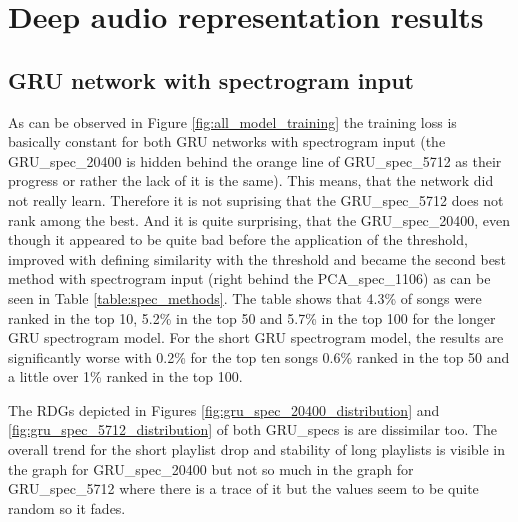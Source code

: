 \section{Deep audio representation results}\label{sec:deep_audio_results}

\subsection{GRU network with spectrogram input}\label{ssec:gru_spec_results}

As can be observed in Figure \ref{fig:all_model_training} the training loss is basically constant for both GRU networks with spectrogram input (the GRU\_spec\_20400 is hidden behind the orange line of GRU\_spec\_5712 as their progress or rather the lack of it is the same). This means, that the network did not really learn. Therefore it is not suprising that the GRU\_spec\_5712 does not rank among the best. And it is quite surprising, that the GRU\_spec\_20400, even though it appeared to be quite bad before the application of the threshold, improved with defining similarity with the threshold and became the second best method with spectrogram input (right behind the PCA\_spec\_1106) as can be seen in Table \ref{table:spec_methods}. The table shows that 4.3\% of songs were ranked in the top 10, 5.2\% in the top 50 and 5.7\% in the top 100 for the longer GRU spectrogram model. For the short GRU spectrogram model, the results are significantly worse with 0.2\% for the top ten songs 0.6\% ranked in the top 50 and a little over 1\% ranked in the top 100. 

The RDGs depicted in Figures \ref{fig:gru_spec_20400_distribution} and \ref{fig:gru_spec_5712_distribution} of both GRU\_specs is are dissimilar too. The overall trend for the short playlist drop and stability of long playlists is visible in the graph for GRU\_spec\_20400 but not so much in the graph for GRU\_spec\_5712 where there is a trace of it but the values seem to be quite random so it fades. 

